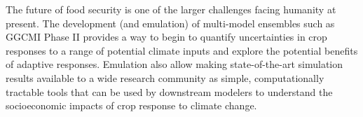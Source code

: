 \documentclass[preprint, 5p, times, twocolumn]{elsarticle}
\begin{document}
{%
The future of food security is one of the larger challenges facing humanity at present. The development (and emulation) of multi-model ensembles such as GGCMI Phase II provides a way to begin to quantify uncertainties in crop responses to a range of potential climate inputs and explore the potential benefits of adaptive responses. Emulation also allow making state-of-the-art simulation results available to a wide research community as simple, computationally tractable tools that can be used by downstream modelers to understand the socioeconomic impacts of crop response to climate change. 




}
\end{document}
